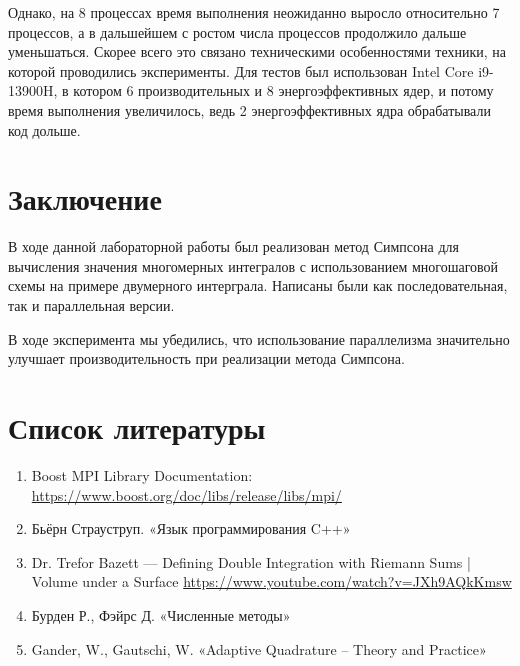 \documentclass[12pt,a4paper]{article}
\begin{document}
Однако, на 8 процессах время выполнения неожиданно выросло относительно 7 процессов, а в дальшейшем с ростом числа процессов продолжило дальше уменьшаться. Скорее всего это связано техническими особенностями техники, на которой проводились эксперименты. Для тестов был использован Intel Core i9-13900H, в котором 6 производительных и 8 энергоэффективных ядер, и потому время выполнения увеличилось, ведь 2 энергоэффективных ядра обрабатывали код дольше.

\section*{Заключение}

В ходе данной лабораторной работы был реализован метод Симпсона для вычисления значения многомерных интегралов с использованием многошаговой схемы на примере двумерного интерграла. Написаны были как последовательная, так и параллельная версии.

В ходе эксперимента мы убедились, что использование параллелизма значительно улучшает производительность при реализации метода Симпсона.

\newpage
\section*{Список литературы}

\begin{enumerate}
    \item Boost MPI Library Documentation: 
    \url{https://www.boost.org/doc/libs/release/libs/mpi/}
    \item Бьёрн Страуструп. «Язык программирования C++»
    \item Dr. Trefor Bazett --- Defining Double Integration with Riemann Sums | Volume under a Surface
    \url{https://www.youtube.com/watch?v=JXh9AQkKmsw}
    \item Бурден Р., Фэйрс Д. «Численные методы»
    \item Gander, W., Gautschi, W. «Adaptive Quadrature – Theory and Practice»
\end{enumerate}

\newpage
\end{document}

